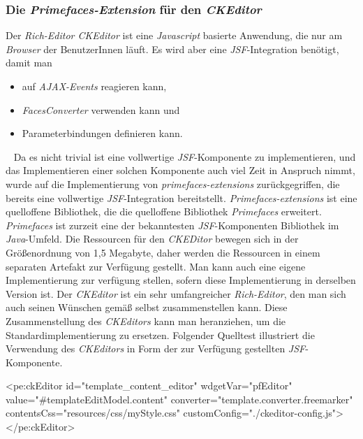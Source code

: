 \subsubsection{Die \emph{Primefaces-Extension} für den \emph{CKEditor}}
Der \emph{Rich-Editor CKEditor} ist eine \emph{Javascript} basierte Anwendung, die nur am \emph{Browser} der BenutzerInnen läuft. Es wird aber eine \emph{JSF}-Integration benötigt, damit man
\begin{itemize}
	\item auf \emph{AJAX-Events} reagieren kann,
	\item\emph{FacesConverter} verwenden kann und
	\item Parameterbindungen definieren kann.
\end{itemize}
\ \newline
Da es nicht trivial ist eine vollwertige \emph{JSF}-Komponente zu implementieren, und das Implementieren einer solchen Komponente auch viel Zeit in Anspruch nimmt, wurde auf die Implementierung von \emph{primefaces-extensions} zurückgegriffen, die bereits eine vollwertige \emph{JSF}-Integration bereitstellt. 
\newline
\emph{Primefaces-extensions} ist eine quelloffene Bibliothek, die die quelloffene Bibliothek \emph{Primefaces} erweitert. \emph{Primefaces} ist zurzeit eine der bekanntesten \emph{JSF}-Komponenten Bibliothek im \emph{Java}-Umfeld.
\newline
\newline
Die Ressourcen für den \emph{CKEDitor} bewegen sich in der Größenordnung von 1,5 Megabyte, daher werden die Ressourcen in einem separaten Artefakt zur Verfügung gestellt. Man kann auch eine eigene Implementierung zur verfügung stellen, sofern diese Implementierung in derselben Version ist. Der \emph{CKEditor} ist ein sehr umfangreicher \emph{Rich-Editor}, den man sich auch seinen Wünschen gemäß selbst zusammenstellen kann. Diese Zusammenstellung des \emph{CKEditors} kann man heranziehen, um die Standardimplementierung zu ersetzen.
\newline
\newline
Folgender Quelltest illustriert die Verwendung des \emph{CKEditors} in Form der zur Verfügung gestellten \emph{JSF}-Komponente.
\label{prog:freemarkerTemplateConverter}
\begin{HtmlCode}
<pe:ckEditor id="template_content_editor"
             wdgetVar="pfEditor"
             value="#{templateEditModel.content}"
             converter="template.converter.freemarker" 
             contentsCss="resources/css/myStyle.css"
             customConfig="./ckeditor-config.js">
</pe:ckEditor>
\end{HtmlCode}
